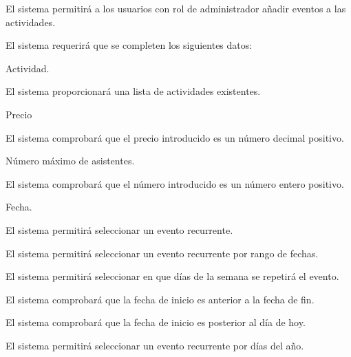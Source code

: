 \begin{enumitem}[label=\bfseries{RAdm \arabic*.},leftmargin=*]
\begin{enumitem}[label*=\bfseries{\arabic*.}]
	\end{enumitem}
	\item El sistema permitirá a los usuarios con rol de administrador añadir eventos a las actividades.
	\begin{enumitem}[label*=\bfseries{\arabic*.}]
		\item El sistema requerirá que se completen los siguientes datos:
		\begin{enumitem}[label*=\bfseries{\arabic*.}]
			\item Actividad.
			\begin{enumitem}[label*=\bfseries{\arabic*.}]
				\item El sistema proporcionará una lista de actividades existentes.
			\end{enumitem}
			\item Precio
			\begin{enumitem}[label*=\bfseries{\arabic*.}]
				\item El sistema comprobará que el precio introducido es un número decimal positivo.
			\end{enumitem}
			\item Número máximo de asistentes.
			\begin{enumitem}[label*=\bfseries{\arabic*.}]
				\item El sistema comprobará que el número introducido es un número entero positivo.
			\end{enumitem}
			\item Fecha.
			\begin{enumitem}[label*=\bfseries{\arabic*.}]
				\item El sistema permitirá seleccionar un evento recurrente.
				\begin{enumitem}[label*=\bfseries{\arabic*.}]
					\item El sistema permitirá seleccionar un evento recurrente por rango de fechas.
					\begin{enumitem}[label*=\bfseries{\arabic*.}]
						\item El sistema permitirá seleccionar en que días de la semana se repetirá el evento.
						\item El sistema comprobará que la fecha de inicio es anterior a la fecha de fin.
						\item El sistema comprobará que la fecha de inicio es posterior al día de hoy.
					\end{enumitem}
					\item El sistema permitirá seleccionar un evento recurrente por días del año.

\end{enumitem}
\end{enumitem}
\end{enumitem}
\end{enumitem}
\end{enumitem}
